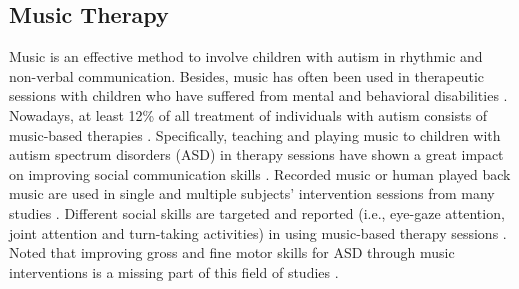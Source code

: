 \subsection{Music Therapy}
Music is an effective method to involve children with autism in rhythmic and non-verbal
communication. Besides, music has often been used in therapeutic sessions with children who 
have suffered from mental and behavioral disabilities \cite{roper2003melodic, boso2007effect}. 
Nowadays, at least 12\% of all treatment of individuals with autism consists of music-based 
therapies \cite{bhat2013review}. Specifically, teaching and playing music to children
with autism spectrum disorders (ASD) in therapy sessions have shown a great impact on improving 
social communication skills \cite{lim2011effects}. Recorded music or human played back music 
are used in single and multiple subjects' intervention sessions from many studies \cite{bhat2013review, corbett2008brief}. 
Different social skills are targeted and reported (i.e., eye-gaze attention, joint attention 
and turn-taking activities) in using music-based therapy sessions \cite{stephens2008spontaneous, kim2008effects}. 
Noted that improving gross and fine motor skills for ASD through music interventions is a 
missing part of this field of studies \cite{bhat2013review}. \\

